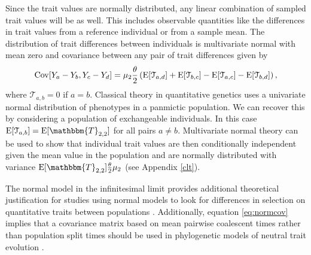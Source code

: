 Since the trait values are normally distributed, any linear combination of
sampled trait values will be as well. This includes observable quantities like
the differences in trait values from a reference individual or from a sample
mean. The distribution of trait differences between individuals is multivariate
normal with mean zero and covariance between any pair of trait differences given
by
\begin{equation}
  \label{eq:normcov}
  \mathrm{Cov}[Y_a-Y_b,Y_c-Y_d] = \mu_  2\frac{\theta}{2}\left( \mathrm{E}[\mathcal{T}_{a,d}] + \mathrm{E}[\mathcal{T}_{b,c}] -
                         \mathrm{E}[\mathcal{T}_{a,c}] - \mathrm{E}[\mathcal{T}_{b,d}] \right),
\end{equation}
where $\mathcal{T}_{a,b} = 0$ if $a=b$. Classical theory in quantitative
genetics uses a univariate normal distribution of phenotypes in a panmictic
population. We can recover this by considering a population of exchangeable
individuals. In this case $\E[\mathcal{T}_{a,b}] = \E[\mathbbm{T}_{2,2}]$ for
all pairs $a \neq b$. Multivariate normal theory can be used to show that
individual trait values are then conditionally independent given the mean value
in the population and are normally distributed with variance
$\E[\mathbbm{T}_{2,2}]\T\mu_2$ (see Appendix \ref{clt}).

The normal model in the infinitesimal limit provides additional theoretical
justification for studies using normal models to look for differences in
selection on quantitative traits between populations
\citep{Ovaskainen2011,Praebel2013,Robinson2015}. Additionally, equation
\eqref{eq:normcov} implies that a covariance matrix based on mean pairwise
coalescent times rather than population split times should be used in
phylogenetic models of neutral trait evolution \citep{Mendes2018}.

 
